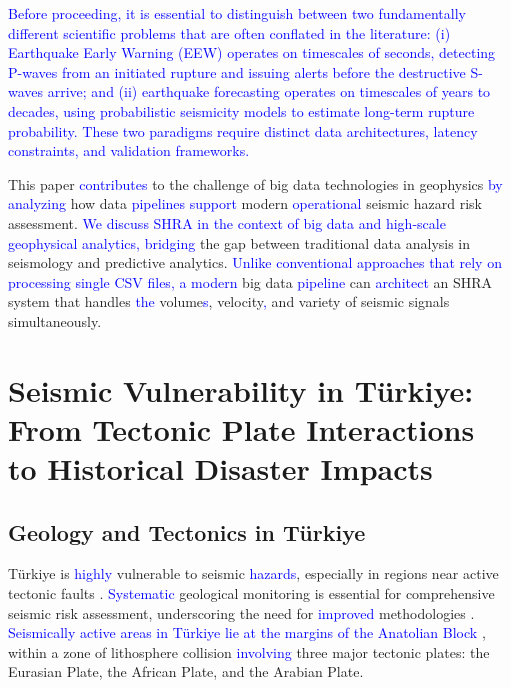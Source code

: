 \documentclass[data,article,submit,pdftex,moreauthors]{Definitions/mdpi}
\begin{document}
\textcolor{blue}{Before proceeding, it is essential to distinguish between two fundamentally different scientific problems that are often conflated in the literature: (i) Earthquake Early Warning (EEW) operates on timescales of seconds, detecting P-waves from an initiated rupture and issuing alerts before the destructive S-waves arrive; and (ii) earthquake forecasting operates on timescales of years to decades, using probabilistic seismicity models to estimate long-term rupture probability. These two paradigms require distinct data architectures, latency constraints, and validation frameworks.}

This paper \textcolor{blue}{contributes} to the challenge of big data technologies in geophysics \textcolor{blue}{by analyzing} how data \textcolor{blue}{pipelines} \textcolor{blue}{support} modern \textcolor{blue}{operational} seismic hazard risk assessment. \textcolor{blue}{We discuss SHRA in the context of big data and high-scale geophysical analytics, bridging} the gap between traditional data analysis in seismology and predictive analytics. \textcolor{blue}{Unlike conventional approaches that rely on processing single CSV files, a modern} big data \textcolor{blue}{pipeline} can \textcolor{blue}{architect} an SHRA system that handles \textcolor{blue}{the} volume\textcolor{blue}{s}, velocity\textcolor{blue}{,} and variety of seismic signals simultaneously.


\section{Seismic Vulnerability in Türkiye: From Tectonic Plate Interactions to Historical Disaster Impacts}

\subsection{Geology and Tectonics in Türkiye}

Türkiye is \textcolor{blue}{highly} vulnerable to seismic \textcolor{blue}{hazards}, especially in regions near active tectonic faults \cite{Basaran2014,Kandregula2024}. \textcolor{blue}{Systematic} geological monitoring is essential for comprehensive seismic risk assessment, underscoring the need for \textcolor{blue}{improved} methodologies \cite{Korkmaz2013}. \textcolor{blue}{Seismically active areas in Türkiye lie at the margins of the Anatolian Block} \cite{Jolivet2023}, within a zone of lithosphere collision \textcolor{blue}{involving} three major tectonic plates: the Eurasian Plate, the African Plate, and the Arabian Plate.
\end{document}
